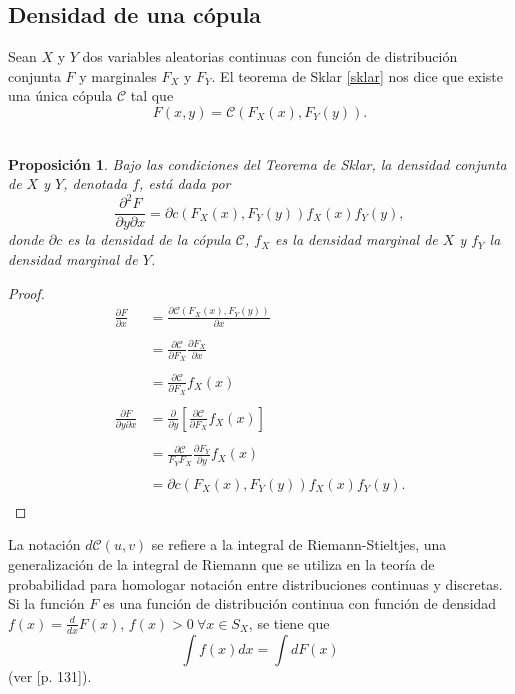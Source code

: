\documentclass[11pt,a4paper]{article}
\newcommand{\C}{\mathcal{C}}
\newtheorem{proposition}{Proposición}[subsection]
\begin{document}
\appendixtitleon
\appendixtitletocon
\begin{appendices}
\section{Densidad de una cópula} \label{densidad_copula}

Sean $X$ y $Y$ dos variables aleatorias continuas con función de distribución conjunta $F$ y marginales $F_X$ y $F_Y$. El teorema de Sklar \ref{sklar} nos dice que existe una única cópula $\C$ tal que $$F(x, y) = \C(F_X(x), F_Y(y)).$$\\

\begin{proposition}
Bajo las condiciones del Teorema de Sklar, la densidad conjunta de $X$ y $Y$, denotada $f$, está dada por $$\frac{\partial^2 F}{\partial y \partial x} = \partial c(F_X(x), F_Y(y))f_X(x)f_Y(y),$$ donde $\partial c$ es la densidad de la cópula $\C$, $f_X$ es la densidad marginal de $X$ y $f_Y$ la densidad marginal de $Y$.
\end{proposition} 

\begin{proof}
\begin{align*}
\frac{\partial F}{\partial x} &= \frac{\partial \C(F_X(x), F_Y(y))}{\partial x}\\\\
&= \frac{\partial \C}{\partial F_X} \frac{\partial F_X}{\partial x}\\\\
&= \frac{\partial \C}{\partial F_X}f_X(x)\\\\
\frac{\partial F}{\partial y \partial x} &= \frac{\partial}{\partial y} \left[\frac{\partial \C}{\partial F_X}f_X(x)\right]\\\\
&= \frac{\partial \C}{F_Y F_X}\frac{\partial F_Y}{\partial y}f_X(x)\\\\
&= \partial c (F_X(x), F_Y(y)) f_X(x) f_Y(y).\\
\end{align*}
\end{proof}

La notación $d\C(u, v)$ se refiere a la integral de Riemann-Stieltjes, una generalización de la integral de Riemann que se utiliza en la teoría de probabilidad para homologar notación entre distribuciones continuas y discretas. Si la función $F$ es una función de distribución continua con función de densidad $f(x) = \frac{d}{dx}F(x)$, $f(x) > 0 \ \forall x \in S_X$, se tiene que $$\int f(x) dx = \int dF(x)$$ (ver \citet{rudin}[p. 131]).\\


\end{appendices}
\end{document}
